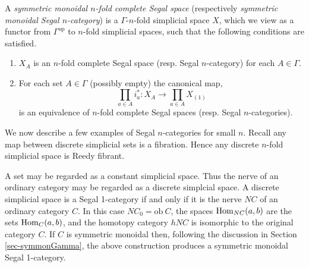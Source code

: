 \documentclass{amsart}
\begin{document}
\begin{definition}
	A {\em symmetric monoidal $n$-fold complete Segal space} (respectively {\em symmetric monoidal Segal $n$-category}) is a $\Gamma$-$n$-fold simplicial space $X$, which we view as a functor from $\Gamma^\textrm{op}$ to $n$-fold simplicial spaces, such that the following conditions are satisfied. 
	\begin{enumerate}
		\item $X_A$ is an $n$-fold complete Segal space (resp. Segal $n$-category) for each $A \in \Gamma$. 
		\item For each set $A \in \Gamma$ (possibly empty) the canonical map,
		\begin{equation*}
			\prod_{a \in A} i_a^*: X_A \to \prod_{a \in A} X_{(1)}
		\end{equation*}
		is an equivalence of $n$-fold complete Segal spaces (resp. Segal $n$-categories). 
	\end{enumerate}
\end{definition}


\noindent We now describe a few examples of Segal $n$-categories for small $n$. Recall any map between discrete simplicial sets is a fibration. Hence any discrete $n$-fold simplicial space is Reedy fibrant.




\begin{example}
	A set may be regarded as a constant simplicial space. Thus the nerve of an ordinary category may be regarded as a discrete simplcial space. A discrete simplicial space is a Segal 1-category if and only if it is the nerve $NC$ of an ordinary category $C$. In this case $NC_0 = \textrm{ob}\ C$, the spaces $\operatorname{Hom}_{NC}(a,b)$ are the sets $\operatorname{Hom}_C(a,b)$, and the homotopy category $\mathit{h}NC$ is isomorphic to the original category $C$. If $C$ is symmetric monoidal then, following the discussion in Section \ref{sec-symmonGamma}, the above construction produces a symmetric monoidal Segal 1-category.  
\end{example}
\end{document}
